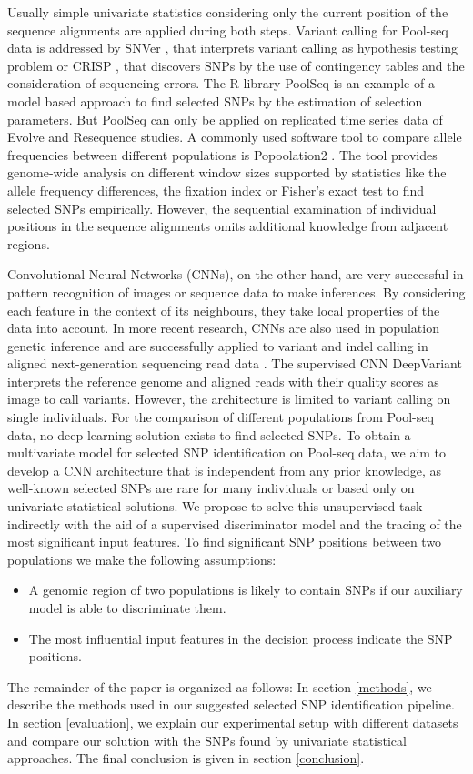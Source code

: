 \documentclass{article}
\begin{document}
Usually simple univariate statistics considering only the current position of the sequence alignments are applied during both steps.
Variant calling for Pool-seq data is addressed by SNVer \cite{SNVer}, that interprets variant calling as hypothesis testing problem or CRISP \cite{crisp}, that discovers SNPs by the use of contingency tables and the consideration of sequencing errors. The R-library PoolSeq \cite{poolSeq} is an example of a model based approach to find selected SNPs by the estimation of selection parameters. But PoolSeq can only be applied on replicated time series data of Evolve and Resequence studies. A commonly used software tool to compare allele frequencies between different populations is Popoolation2 \cite{popoolation2}. The tool provides genome-wide analysis on different window sizes supported by statistics like the allele frequency differences, the fixation index or  Fisher's exact test to find selected SNPs empirically. However, the sequential examination of individual positions in the sequence alignments omits additional knowledge from adjacent regions.

Convolutional Neural Networks (CNNs), on the other hand, are very successful in pattern recognition of images \cite{image_reco} or sequence data \cite{speech_reco} to make inferences.
By considering each feature in the context of its neighbours, they take local properties of the data into account. In more recent research, CNNs are also used in population genetic inference \cite{popul_inference} and are successfully applied to variant and indel calling in aligned next-generation sequencing read data \cite{deepVariant}. 
The supervised CNN DeepVariant \cite{deepVariant} interprets the reference genome and aligned reads with their quality scores as image to call variants. However, the architecture is limited to variant calling on single individuals.
For the comparison of different populations from Pool-seq data, no deep learning solution exists to find selected SNPs. 
To obtain a multivariate model for selected SNP identification on Pool-seq data, we aim to develop a CNN architecture that is independent from any prior knowledge, as well-known selected SNPs are rare for many individuals or based only on univariate statistical solutions.
We propose to solve this unsupervised task indirectly with the aid of a supervised discriminator model and the tracing of the most significant input features.
To find significant SNP positions between two populations we make the following assumptions: 
\begin{itemize}
    \item A genomic region of two populations is likely to contain SNPs if our auxiliary model is able to discriminate them.
    \item The most influential input features in the decision process indicate the SNP positions.
\end{itemize}
The remainder of the paper is organized as follows: In section \ref{methods}, we describe the methods used in our suggested selected SNP identification pipeline. In section \ref{evaluation}, we explain our experimental setup with different datasets and compare our solution with the SNPs found by univariate statistical approaches. The final conclusion is given in section \ref{conclusion}.
\end{document}
